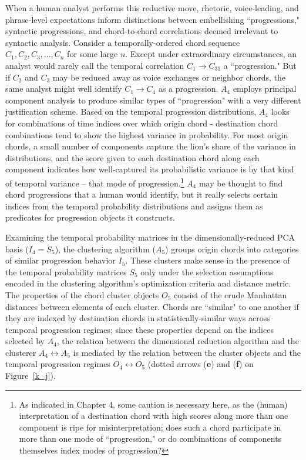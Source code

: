 When a human analyst performs this reductive move, rhetoric, voice-leading, and phrase-level expectations inform distinctions between embellishing ``progressions," syntactic progressions, and chord-to-chord correlations deemed irrelevant to syntactic analysis.  Consider a temporally-ordered chord sequence $C_1, C_2, C_3,...,C_n$ for some large $n$.  Except under extraordinary circumstances, an analyst would rarely call the temporal correlation $C_1 \rightarrow C_{31}$ a ``progression."  But if $C_2$ and $C_3$ may be reduced away as voice exchanges or neighbor chords, the same analyst might well identify $C_1 \rightarrow C_4$ as a progression.  $A_4$ employs principal component analysis to produce similar types of ``progression" with a very different justification scheme.  Based on the temporal progression distributions, $A_4$ looks for combinations of time indices over which origin chord - destination chord combinations tend to show the highest variance in probability.  For most origin chords, a small number of components capture the lion's share of the variance in distributions, and the score given to each destination chord along each component indicates how well-captured its probabilistic variance is by that kind of temporal variance -- that mode of progression.\footnote{As indicated in Chapter 4, some caution is necessary here, as the (human) interpretation of a destination chord with high scores along more than one component is ripe for misinterpretation; does such a chord participate in more than one mode of ``progression," or do combinations of components themselves index modes of progression?}  $A_4$ may be thought to find chord progressions that a human would identify, but it really selects certain indices from the temporal probability distributions and assigns them as predicates for progression objects it constructs.

Examining the temporal probability matrices in the dimensionally-reduced PCA basis ($I_4 = S_5$), the clustering algorithm ($A_5$) groups origin chords into categories of similar progression behavior $I_5$.  These clusters make sense in the presence of the temporal probability matrices $S_5$ only under the selection assumptions encoded in the clustering algorithm's optimization criteria and distance metric.  The properties of the chord cluster objects $O_5$ consist of the crude Manhattan distances between elements of each cluster.  Chords are ``similar" to one another if they are indexed by destination chords in statistically-similar ways across temporal progression regimes; since these properties depend on the indices selected by $A_4$, the relation between the dimensional reduction algorithm and the clusterer $A_4 \leftrightarrow A_5$ is mediated by the relation between the cluster objects and the temporal progression regimes $O_4 \leftrightarrow O_5$ (dotted arrows (\textbf{e}) and (\textbf{f}) on Figure~\ref{k_j}).

